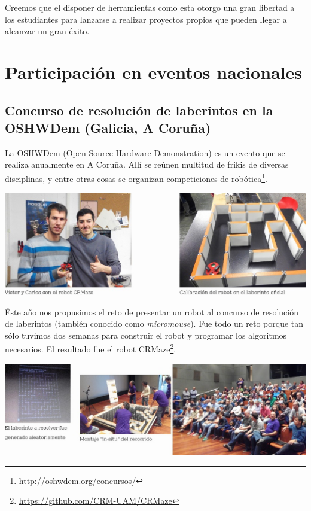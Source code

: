 \documentclass[12pt,twoside]{report}
\begin{document}
Creemos que el disponer de herramientas como esta otorgo una gran libertad a los estudiantes para lanzarse a realizar proyectos propios que pueden llegar a alcanzar un gran éxito.

\newpage

\section{Participación en eventos nacionales}


\subsection{Concurso de resolución de laberintos en la OSHWDem (Galicia, A Coruña)}

La OSHWDem (Open Source Hardware Demonstration) es un evento que se realiza anualmente en A Coruña. Allí se reúnen multitud de frikis de diversas disciplinas, y entre otras cosas se organizan competiciones de robótica\footnote{\url{http://oshwdem.org/concursos/}}.

\vspace{5mm}

\centerline{\includegraphics[width=1.1\linewidth]{fotos/oshwdem2015_robot}}

Éste año nos propusimos el reto de presentar un robot al concurso de resolución de laberintos (también conocido como \emph{micromouse}). Fue todo un reto porque tan sólo tuvimos dos semanas para construir el robot y programar los algoritmos necesarios.
El resultado fue el robot CRMaze\footnote{\url{https://github.com/CRM-UAM/CRMaze}}.


\vspace{5mm}
\centerline{\includegraphics[width=1.1\linewidth]{fotos/oshwdem2015_laberinto}}
\end{document}
